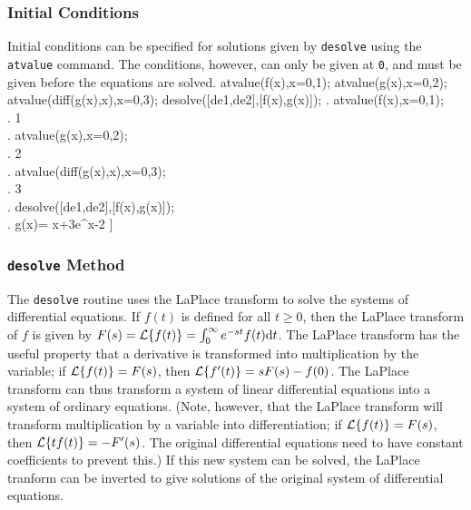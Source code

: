 \documentclass{article}
\begin{document}
\subsubsection{Initial Conditions}

Initial conditions can be specified for solutions given by
\texttt{desolve} using the \texttt{atvalue} command.
The conditions, however, can only be given at \texttt{0}, and
must be given before the equations are solved.
\beginmaximasession
atvalue(f(x),x=0,1);
atvalue(g(x),x=0,2);
atvalue(diff(g(x),x),x=0,3);
desolve([de1,de2],[f(x),g(x)]);
\maximatexsession
{}.  atvalue(f(x),x=0,1); \\
.   1 \\
.  atvalue(g(x),x=0,2); \\
.   2 \\
.  atvalue(diff(g(x),x),x=0,3); \\
.   3 \\
.  desolve([de1,de2],[f(x),g(x)]); \\
.   \left[ f\left(x\right)=3\*e^{x}-2,\linebreak[0]g\left(x\right)=
 \cos x+3\*e^{x}-2 \right]  \\
\endmaximasession

\subsubsection{\texttt{desolve} Method}

The \texttt{desolve} routine uses the LaPlace transform to solve the
systems of differential equations.
If $f(t)$ is defined for all $t \ge 0$, then the LaPlace transform of
$f$ is given by $F(s)={\cal L}\{f(t)\} = \int_0^\infty
e^{-st}f(t)\textrm{d}t$.   The LaPlace transform has the useful
property that a derivative is transformed into multiplication by the
variable; if ${\cal L}\{f(t)\} = F(s)$, then 
${\cal L}\{f'(t)\} = sF(s)-f(0)$.  The LaPlace transform can thus
transform a system of linear differential equations into a system of
ordinary equations.  
(Note, however, that the LaPlace transform will transform
multiplication by a variable into differentiation; 
if ${\cal L}\{f(t)\} = F(s)$, then ${\cal L}\{tf(t)\} = -F'(s)$. 
The original differential equations need to have constant
coefficients to prevent this.)
If this new system can be solved, the LaPlace
tranform can be inverted to give solutions of the original system of
differential equations.
\end{document}
